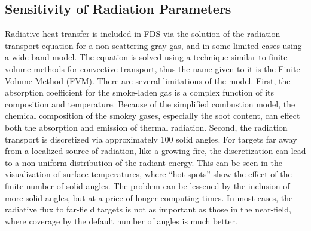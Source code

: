 \documentclass[11pt]{book}
\begin{document}
\subsection{Sensitivity of Radiation Parameters}

Radiative heat  transfer is  included in FDS  via the solution  of the radiation  transport equation for  a non-scattering  gray gas,  and in some
limited  cases using  a wide band  model. The equation  is solved using  a technique  similar to  finite volume  methods  for convective transport,
thus the  name given  to it  is the  Finite  Volume Method (FVM).  There  are  several  limitations  of  the  model.  First,  the absorption
coefficient  for the smoke-laden gas is  a complex function of  its  composition  and   temperature.  Because  of  the  simplified combustion  model,
the  chemical  composition of  the  smokey  gases, especially  the  soot content,  can  effect  both  the absorption  and emission  of thermal
radiation.  Second, the  radiation transport  is discretized via  approximately 100 solid angles. For  targets far away from  a  localized source  of
radiation,  like  a growing  fire,  the discretization can  lead to a non-uniform distribution  of the radiant energy. This can be seen in the
visualization of surface temperatures, where  ``hot spots'' show  the effect  of the  finite number  of solid angles. The  problem can  be lessened
by  the inclusion of  more solid angles, but at  a price of longer computing times.  In most cases, the radiative flux  to far-field targets is  not
as important  as those in the near-field, where coverage by the default number of angles is much better.
\end{document}
